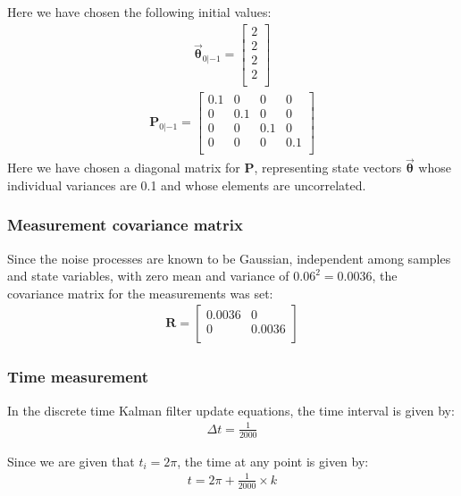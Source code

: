 \documentclass[a4paper]{article}
\begin{document}
		\noindent Here we have chosen the following initial values:
		\begin{align}
			\bm{\vec{\theta}}_{0|-1}=
			\begin{bmatrix}
				2\\
				2\\
				2\\
				2\\
			\end{bmatrix}
		\end{align}
		\begin{align}
			\bm{P}_{0|-1}=
			\begin{bmatrix}
			0.1	&	0 	&	0 & 	0 \\
			0 &		0.1 &	0 &		0 \\
			0 &		0 &		0.1 &	0 \\
			0 &		0 &		0 &		0.1 \\
			\end{bmatrix}
		\end{align}
		Here we have chosen a diagonal matrix for $\bm{P}$, representing state vectors $\bm{\vec{\theta}}$ whose individual variances are 0.1 and whose elements are uncorrelated.
		
		\subsubsection{Measurement covariance matrix}\label{Measurement_covariance_matrix}
			\noindent Since the noise processes are known to be Gaussian, independent among samples and state variables, with zero mean and variance of $0.06^2=0.0036$, the covariance matrix for the measurements was set:
			\begin{align}
				\bm{R}=
				\begin{bmatrix}
				0.0036 & 0 \\
				0 & 0.0036 \\
				\end{bmatrix}
			\end{align}
			
		\subsubsection{Time measurement}\label{Time_measurement}
			\noindent In the discrete time Kalman filter update equations, the time interval is given by:
			\begin{align}
				\Delta t=\frac{1}{2000}
			\end{align}

			\noindent Since we are given that $t_i=2\pi$, the time at any point is given by:
			\begin{align}
				t=2\pi+\frac{1}{2000} \times k \label{Time_equ}
			\end{align}
				
\end{document}
